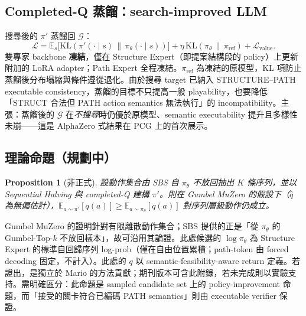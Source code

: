 \documentclass[11pt,a4paper]{article}
\newtheorem{proposition}{Proposition}
\newcommand{\Gp}{\mathcal{G}}
\begin{document}
\subsection{Completed-Q 蒸餾：search-improved LLM}
搜尋後的 $\pi'$ 蒸餾回 $\Gp$：
\begin{equation}
\mathcal{L}=\mathbb{E}_{s}\bigl[\mathrm{KL}(\pi'(\cdot\mid s)\,\|\,\pi_\theta(\cdot\mid s))\bigr]+\eta\,\mathrm{KL}(\pi_\theta\,\|\,\pi_{\text{ref}})+\mathcal{L}_{\text{value}}.
\end{equation}
雙專家 backbone \textbf{凍結}，僅在 Structure Expert（即提案結構段的 policy）上更新附加的 LoRA adapter；Path Expert 全程凍結。$\pi_{\text{ref}}$ 為凍結的原模型，KL 項防止蒸餾後分布塌縮與條件遵從退化。由於搜尋 target 已納入 STRUCTURE--PATH executable consistency，蒸餾的目標不只提高一般 playability，也要降低「STRUCT 合法但 PATH action semantics 無法執行」的 incompatibility。主張：蒸餾後的 $\Gp$ 在\emph{不搜尋}時仍優於原模型、semantic executability 提升且多樣性未崩——這是 AlphaZero 式結果在 PCG 上的首次展示。

\subsection{理論命題（規劃中）}
\begin{proposition}[非正式]
設動作集合由 SBS 自 $\pi_\theta$ 不放回抽出 $K$ 條序列，並以 Sequential Halving 與 completed-Q 建構 $\pi'$。則在 Gumbel MuZero 的假設下（$\hat q$ 為無偏估計），$\mathbb{E}_{a\sim\pi'}[q(a)]\ge\mathbb{E}_{a\sim\pi_\theta}[q(a)]$ 對序列層級動作仍成立。
\end{proposition}
Gumbel MuZero 的證明針對有限離散動作集合；SBS 提供的正是「從 $\pi_\theta$ 的 Gumbel-Top-$k$ 不放回樣本」，故可沿用其論證。此處候選的 $\log\pi_\theta$ 為 Structure Expert 的標準自回歸序列 log-prob（僅在自由位置累積；path-token 由 forced decoding 固定，不計入）。此處的 $q$ 以 semantic-feasibility-aware return 定義。若證出，是獨立於 Mario 的方法貢獻；期刊版本可含此附錄，若未完成則以實驗支持。需明確區分：此命題是 sampled candidate set 上的 policy-improvement 命題，而「接受的關卡符合已編碼 PATH semantics」則由 executable verifier 保證。
\end{document}
